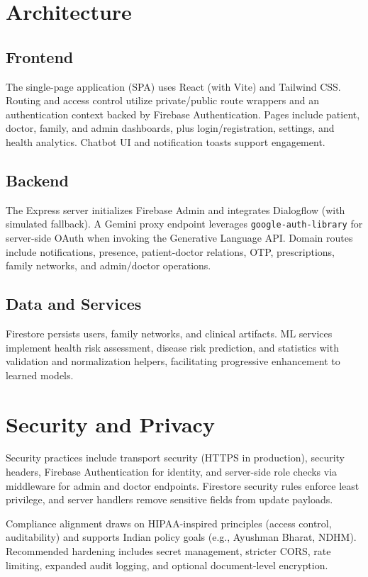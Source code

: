 \documentclass[conference]{IEEEtran}
\begin{document}
\section{Architecture}
\subsection{Frontend}
The single-page application (SPA) uses React (with Vite) and Tailwind CSS. Routing and access control utilize private/public route wrappers and an authentication context backed by Firebase Authentication. Pages include patient, doctor, family, and admin dashboards, plus login/registration, settings, and health analytics. Chatbot UI and notification toasts support engagement.

\subsection{Backend}
The Express server initializes Firebase Admin and integrates Dialogflow (with simulated fallback). A Gemini proxy endpoint leverages \texttt{google-auth-library} for server-side OAuth when invoking the Generative Language API. Domain routes include notifications, presence, patient-doctor relations, OTP, prescriptions, family networks, and admin/doctor operations.

\subsection{Data and Services}
Firestore persists users, family networks, and clinical artifacts. ML services implement health risk assessment, disease risk prediction, and statistics with validation and normalization helpers, facilitating progressive enhancement to learned models.

\section{Security and Privacy}
Security practices include transport security (HTTPS in production), security headers, Firebase Authentication for identity, and server-side role checks via middleware for admin and doctor endpoints. Firestore security rules enforce least privilege, and server handlers remove sensitive fields from update payloads.

Compliance alignment draws on HIPAA-inspired principles (access control, auditability) and supports Indian policy goals (e.g., Ayushman Bharat, NDHM). Recommended hardening includes secret management, stricter CORS, rate limiting, expanded audit logging, and optional document-level encryption.
\end{document}
